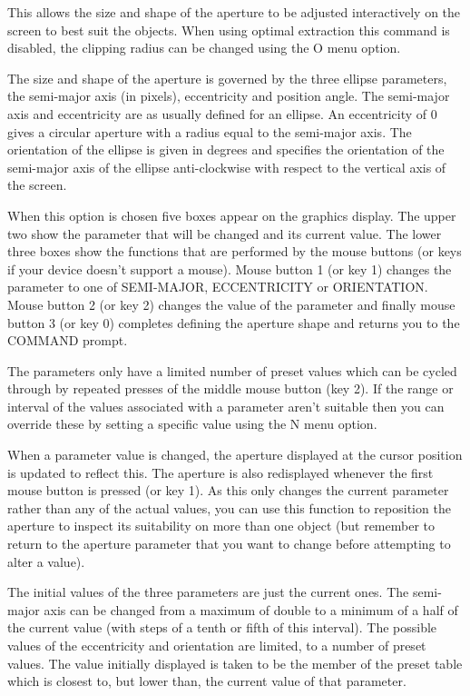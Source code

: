 \documentclass[twoside,11pt]{article}
\renewcommand{\_}{\texttt{\symbol{95}}}
\begin{document}
This allows the size and shape of the aperture to be adjusted
interactively on the screen to best suit the objects. When using
optimal extraction this command is disabled, the clipping radius
can be changed using the O menu option.

The size and shape of the aperture is governed by the three ellipse
parameters, the semi-major axis (in pixels), eccentricity and position
angle.  The semi-major axis and eccentricity are as usually defined
for an ellipse. An eccentricity of 0 gives a circular aperture with a
radius equal to the semi-major axis. The orientation of the ellipse is
given in degrees and specifies the orientation of the semi-major axis
of the ellipse anti-clockwise with respect to the vertical axis of the
screen.

When this option is chosen five boxes appear on the graphics display.
The upper two show the parameter that will be changed and its current
value. The lower three boxes show the functions that are performed by
the mouse buttons (or keys if your device doesn't support a
mouse). Mouse button 1 (or key 1) changes the parameter to one of
SEMI-MAJOR, ECCENTRICITY or ORIENTATION. Mouse button 2 (or key 2)
changes the value of the parameter and finally mouse button 3 (or key
0) completes defining the aperture shape and returns you to the
COMMAND prompt.

The parameters only have a limited number of
preset values which can be cycled through by repeated presses of the
middle mouse button (key 2).
If the range or interval of the values associated with a parameter
aren't suitable then you can override these by setting a specific
value using the N menu option.

When a parameter value is changed, the aperture displayed at the
cursor position is updated to reflect this. The aperture is also
redisplayed whenever the first mouse button is pressed (or key 1).
As this only changes the current parameter rather than any of the
actual values, you can use this function to reposition the aperture to
inspect its suitability on more than one object (but remember to
return to the aperture parameter that you want to change before
attempting to alter a value).

The initial values of the three parameters are just the current ones.
The semi-major axis can be changed from a maximum of double to a
minimum of a half of the current value (with steps of a tenth or fifth
of this interval).  The possible values of the eccentricity and
orientation are limited, to a number of preset values. The value
initially displayed is taken to be the member of the preset table
which is closest to, but lower than, the current value of that
parameter.
\end{document}
